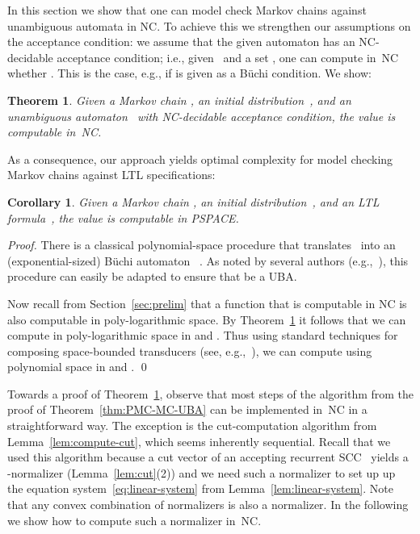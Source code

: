 \documentclass{elsarticle}
\newtheorem{theorem}[definition]{Theorem}
\newtheorem{corollary}[definition]{Corollary}
\begin{document}
In this section we show that one can model check Markov chains against unambiguous automata in NC.
To achieve this we strengthen our assumptions on the acceptance condition:
we assume that the given automaton  has an NC-decidable acceptance condition; i.e., given~ and a set , one can compute in~NC whether .
This is the case, e.g., if  is given as a B\"uchi condition.
We show:
\begin{theorem} \label{thm:NC}
  Given a Markov chain , an initial distribution~, and an unambiguous automaton~ with NC-decidable acceptance condition,
  the value  is computable in~NC.
\end{theorem}
As a consequence, our approach yields optimal complexity for model checking Markov chains against LTL specifications:
\begin{corollary} \label{cor:LTL-PSPACE} Given a Markov chain ,
  an initial distribution~, and an LTL formula~, the
  value  is computable in PSPACE.
\end{corollary}
\begin{proof}
  There is a classical polynomial-space procedure that
  translates~ into an (exponential-sized) B\"{u}chi automaton
  ~\cite{VardiWolper86}.  As noted by several authors
  (e.g.,~\cite{ChaKat14,CouSahSut03}), this procedure can easily be
  adapted to ensure that  be a UBA.

  Now recall from Section~\ref{sec:prelim} that a function that is
  computable in NC is also computable in poly-logarithmic space. By
  Theorem~\ref{thm:NC} it follows that we can compute
   in poly-logarithmic space in 
  and .  Thus using standard techniques for composing
  space-bounded transducers (see, e.g.,~\cite[Proposition
  8.2]{Pap94}), we can compute  using
  polynomial space in  and . \qed
\end{proof}

Towards a proof of Theorem~\ref{thm:NC}, observe that most steps of
the algorithm from the proof of Theorem~\ref{thm:PMC-MC-UBA} can be
implemented in~NC in a straightforward way.  The exception is the
cut-computation algorithm from Lemma~\ref{lem:compute-cut}, which
seems inherently sequential.  Recall that we used this algorithm
because a cut vector of an accepting recurrent SCC~ yields a
-normalizer (Lemma~\ref{lem:cut}(2)) and we need such a normalizer
to set up up the equation system~\eqref{eq:linear-system} from
Lemma~\ref{lem:linear-system}.  Note that any convex combination of
normalizers is also a normalizer.  In the following we show how to
compute such a normalizer in~NC.
\end{document}
